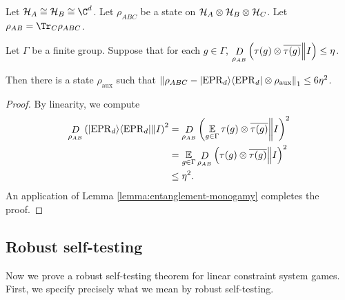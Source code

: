\begin{cor}\label{lemma:stabilizer-state}
	Let $\m H_A \cong \m H_B \cong \C^d$. Let $\rho_{ABC}$ be a state on $\mathcal H_A\otimes \mathcal H_B \otimes \mathcal H_C$. Let $\rho_{AB} = \Tr_C\rho_{ABC}$. 

	Let $\Gamma$ be a finite group. Suppose that for each $g\in \Gamma$, $\mathop{D}\limits_{\rho_{AB}}\left(\tau(g)\otimes \overline{\tau(g)}\middle\| I\right) \leq \eta$. 

	Then there is a state $\rho_{\text{aux}}$ such that $\left\Vert\rho_{ABC} - \ket{{\mathrm{EPR}_d}}\!\bra{{\mathrm{EPR}_d}}\otimes \rho_\text{aux}\right\Vert_1 \leq 6\eta^2$.
\end{cor}
\begin{proof}
By linearity, we compute
\begin{align}
	\mathop{D}\limits_{\rho_{AB}}\left(\ket{{\mathrm{EPR}_d}}\!\bra{{\mathrm{EPR}_d}}\middle\| I\right)^2
	&=\mathop{D}\limits_{\rho_{AB}}\left(\operatorname*{\mathbb E}\limits_{g\in \Gamma}\tau(g)\otimes\overline{\tau(g)}\middle\| I\right)^2
	\\&=\operatorname*{\mathbb E}\limits_{g \in \Gamma}\mathop{D}\limits_{\rho_{AB}}\left(\tau(g)\otimes\overline{\tau(g)}\middle\| I\right)^2
	\\& \leq \eta^2.
\end{align}
An application of Lemma \ref{lemma:entanglement-monogamy} completes the proof.
	 
\end{proof}

\subsection{Robust self-testing}\label{subsection:robust-self-testing}

Now we prove a robust self-testing theorem for linear constraint system games. First, we specify precisely what we mean by robust self-testing.

